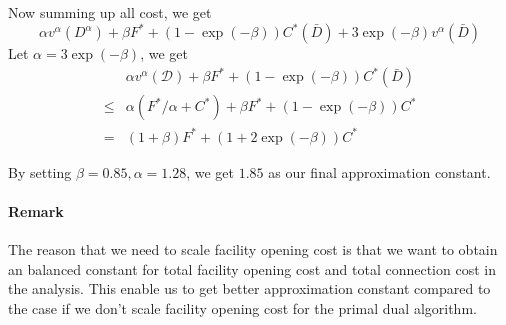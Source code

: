 Now summing up all cost, we get
\[
\alpha v^\alpha(D^\alpha) + \beta F^* + (1-\exp(-\beta)) C^*(\bar D) + 3\exp(-\beta)v^\alpha(\bar D)
\]
Let $\alpha = 3\exp(-\beta)$, we get
\begin{align*}
& \alpha v^\alpha(\mathcal{D}) + \beta F^* + (1-\exp(-\beta)) C^*(\bar D) \\
\le & \alpha(F^*/\alpha + C^*) + \beta F^* + (1-\exp(-\beta)) C^* \\
= & (1 + \beta) F^* + (1 + 2\exp(-\beta)) C^*
\end{align*}

By setting $\beta=0.85, \alpha=1.28$, we get $1.85$ as our final approximation constant.

\paragraph{Remark} The reason that we need to scale facility opening cost is that
we want to obtain an balanced constant for total facility opening cost and
total connection cost in the analysis.
This enable us to get better approximation constant compared to the case
if we don't scale facility opening cost for the primal dual algorithm.